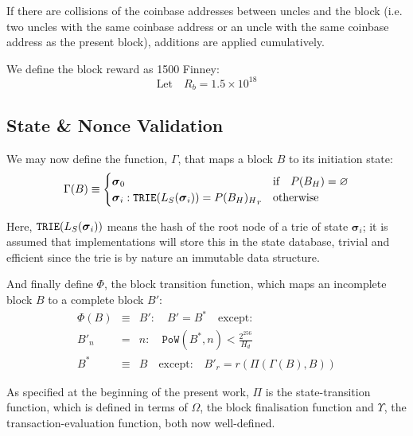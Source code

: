\documentclass[9pt,oneside]{amsart}
\begin{document}
\begin{multicols}{2}
If there are collisions of the coinbase addresses between uncles and the block (i.e. two uncles with the same coinbase address or an uncle with the same coinbase address as the present block), additions are applied cumulatively.

We define the block reward as 1500 Finney:
\begin{equation}
\text{Let} \quad R_b = 1.5 \times 10^{18}
\end{equation}

\subsection{State \& Nonce Validation}\label{sec:statenoncevalidation}

We may now define the function, $\Gamma$, that maps a block $B$ to its initiation state:
\begin{equation}
\Gamma(B) \equiv \begin{cases}
\boldsymbol{\sigma}_0 & \text{if} \quad P(B_H) = \varnothing \\
\boldsymbol{\sigma}_i: \mathtt{\small TRIE}(L_S(\boldsymbol{\sigma}_i)) = {P(B_H)_H}_r & \text{otherwise}
\end{cases}
\end{equation}

Here, $\mathtt{\small TRIE}(L_S(\boldsymbol{\sigma}_i))$ means the hash of the root node of a trie of state $\boldsymbol{\sigma}_i$; it is assumed that implementations will store this in the state database, trivial and efficient since the trie is by nature an immutable data structure.

And finally define $\Phi$, the block transition function, which maps an incomplete block $B$ to a complete block $B'$:
\begin{eqnarray}
\Phi(B) & \equiv & B': \quad B' = B^* \quad \text{except:} \\
B'_n & = & n: \quad \mathtt{PoW}(B^*, n) < \frac{2^{256}}{H_d} \\
B^* & \equiv & B \quad \text{except:} \quad B'_r = r(\Pi(\Gamma(B), B))
\end{eqnarray}

As specified at the beginning of the present work, $\Pi$ is the state-transition function, which is defined in terms of $\Omega$, the block finalisation function and $\Upsilon$, the transaction-evaluation function, both now well-defined.


\end{multicols}
\end{document}
